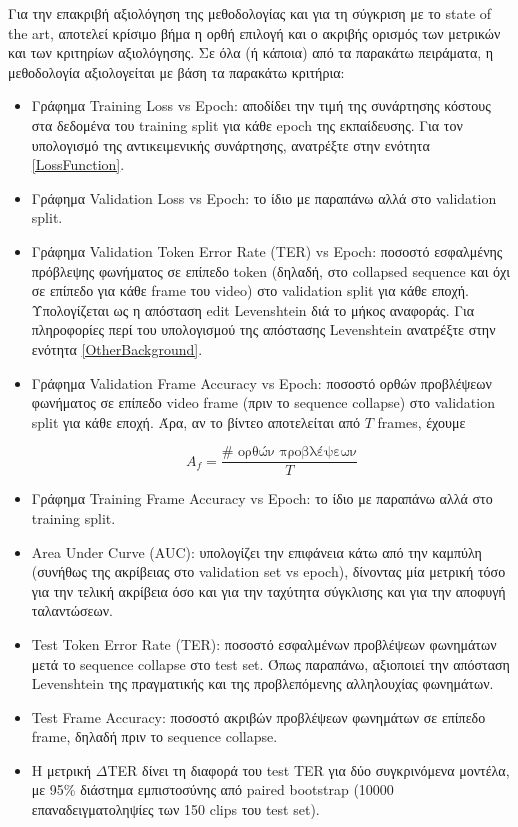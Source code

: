 Για την επακριβή αξιολόγηση της μεθοδολογίας και για τη σύγκριση με το state of the art, αποτελεί κρίσιμο βήμα η ορθή επιλογή και ο ακριβής ορισμός των μετρικών και των κριτηρίων αξιολόγησης. Σε όλα (ή κάποια) από τα παρακάτω πειράματα, η μεθοδολογία αξιολογείται με βάση τα παρακάτω κριτήρια:

\begin{itemize}

\item Γράφημα Training Loss vs Epoch: αποδίδει την τιμή της συνάρτησης κόστους στα δεδομένα του training split για κάθε epoch της εκπαίδευσης. Για τον υπολογισμό της αντικειμενικής συνάρτησης, ανατρέξτε στην ενότητα \ref{LossFunction}.

\item Γράφημα Validation Loss vs Epoch: το ίδιο με παραπάνω αλλά στο validation split.

\item Γράφημα Validation Token Error Rate (TER) vs Epoch: ποσοστό εσφαλμένης πρόβλεψης φω\-νή\-μα\-τος σε επίπεδο token (δηλαδή, στο collapsed sequence και όχι σε επίπεδο για κάθε frame του video) στο validation split για κάθε εποχή. Υπολογίζεται ως η απόσταση edit Levenshtein διά το μήκος αναφοράς. Για πληροφορίες περί του υπολογισμού της απόστασης Levenshtein ανατρέξτε στην ενότητα \ref{OtherBackground}.

\item Γράφημα Validation Frame Accuracy vs Epoch: ποσοστό ορθών προβλέψεων φωνήματος σε επίπεδο video frame (πριν το sequence collapse) στο validation split για κάθε εποχή. Άρα, αν το βίντεο αποτελείται από $T$ frames, έχουμε 

\[
A_f = \frac{\#\text{ ορθών προβλέψεων}}{T}
\]

\item Γράφημα Training Frame Accuracy vs Epoch: το ίδιο με παραπάνω αλλά στο training split.

\item Area Under Curve (AUC): υπολογίζει την επιφάνεια κάτω από την καμπύλη (συνήθως της ακρίβειας στο validation set vs epoch), δίνοντας μία μετρική τόσο για την τελική ακρίβεια όσο και για την ταχύτητα σύγκλισης και για την αποφυγή ταλαντώσεων. 

\item Test Token Error Rate (TER): ποσοστό εσφαλμένων προβλέψεων φωνημάτων μετά το sequence collapse στο test set. Όπως παραπάνω, αξιοποιεί την απόσταση Levenshtein της πραγματικής και της προβλεπόμενης αλληλουχίας φωνημάτων.

\item Test Frame Accuracy: ποσοστό ακριβών προβλέψεων φωνημάτων σε επίπεδο frame, δηλαδή πριν το sequence collapse.

\item Η μετρική $\Delta$TER δίνει τη διαφορά του test TER για δύο συγκρινόμενα μοντέλα, με 95\% διάστημα εμπιστοσύνης από paired bootstrap (10000 επαναδειγματοληψίες των 150 clips του test set).

\end{itemize}


